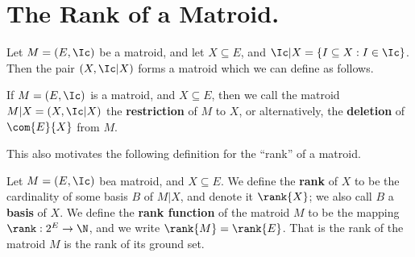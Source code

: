 
\section{The Rank of a Matroid.}

Let $M=(E,\Ic)$ be a matroid, and let $X \subseteq E$, and  $\Ic|X=\{I \subseteq
X : I \in \Ic\}$. Then the pair $(X,\Ic|X)$ forms a matroid which we can define
as follows.

\begin{definition}
    If $M=(E,\Ic)$ is a matroid, and $X \subseteq E$, then we call the matroid
    $M|X=(X,\Ic|X)$ the \textbf{restriction} of $M$ to  $X$, or alternatively,
    the \textbf{deletion} of $\com{E}{X}$ from $M$.
\end{definition}

This also motivates the following definition for the ``rank'' of a matroid.

\begin{definition}
    Let $M=(E,\Ic)$ bea matroid, and $X \subseteq E$. We define the
    \textbf{rank} of $X$ to be the cardinality of some basis  $B$ of  $M|X$, and
    denote it  $\rank{X}$; we also call $B$ a  \textbf{basis} of $X$. We define
    the  \textbf{rank function} of the matroid $M$ to be the mapping  $\rank:2^E
    \rightarrow \N$, and we write $\rank{M}=\rank{E}$. That is the rank of the
    matroid $M$ is the rank of its ground set.
\end{definition}

